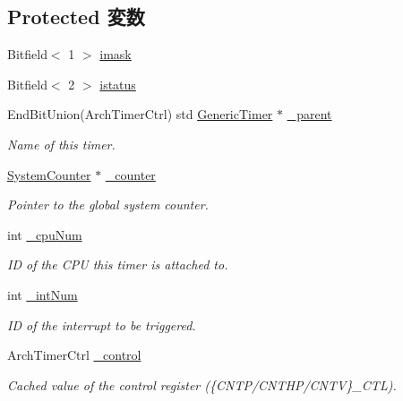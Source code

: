 \subsection*{Protected 変数}
\begin{DoxyCompactItemize}
\item 
Bitfield$<$ 1 $>$ \hyperlink{classGenericTimer_1_1ArchTimer_ad52539c365dfb10b7ee0d2bdc178c2d8}{imask}
\item 
Bitfield$<$ 2 $>$ \hyperlink{classGenericTimer_1_1ArchTimer_a8bbee8ee464bb7f6275e9f06c6e279fe}{istatus}
\item 
EndBitUnion(ArchTimerCtrl) std \hyperlink{classGenericTimer}{GenericTimer} $\ast$ \hyperlink{classGenericTimer_1_1ArchTimer_a4de0833faa175ea06f056c4661ddba69}{\_\-parent}
\begin{DoxyCompactList}\small\item\em Name of this timer. \item\end{DoxyCompactList}\item 
\hyperlink{classGenericTimer_1_1SystemCounter}{SystemCounter} $\ast$ \hyperlink{classGenericTimer_1_1ArchTimer_a20843f1c5d7b269ec4cd9f246d83e932}{\_\-counter}
\begin{DoxyCompactList}\small\item\em Pointer to the global system counter. \item\end{DoxyCompactList}\item 
int \hyperlink{classGenericTimer_1_1ArchTimer_ada4874eb9ccf0bd190c82504cb7f00dc}{\_\-cpuNum}
\begin{DoxyCompactList}\small\item\em ID of the CPU this timer is attached to. \item\end{DoxyCompactList}\item 
int \hyperlink{classGenericTimer_1_1ArchTimer_a898e65f2e5a34e6e211acb79ab3aaae2}{\_\-intNum}
\begin{DoxyCompactList}\small\item\em ID of the interrupt to be triggered. \item\end{DoxyCompactList}\item 
ArchTimerCtrl \hyperlink{classGenericTimer_1_1ArchTimer_ac5f2bc920c716e4c333635c6acc3e928}{\_\-control}
\begin{DoxyCompactList}\small\item\em Cached value of the control register (\{CNTP/CNTHP/CNTV\}\_\-CTL). \item\end{DoxyCompactList}\item 

\end{DoxyCompactItemize}
